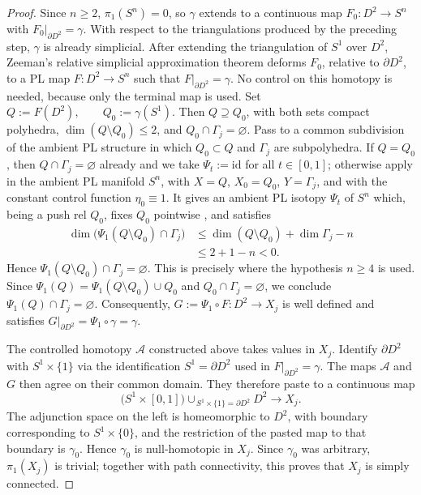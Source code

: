 \documentclass[12pt,oneside,a4paper]{article}
\theoremstyle{mytheorem}
\theoremstyle{remark}
\theoremstyle{definition}
\begin{document}
\begin{proof}
Since $n\geq2$, $\pi_1(S^n)=0$, so $\gamma$ extends to a
continuous map $F_0:D^2\to S^n$ with
$F_0|_{\partial D^2}=\gamma$.  With respect to the triangulations produced by the preceding step,
$\gamma$ is already simplicial. After extending the triangulation of $S^1$
over $D^2$, Zeeman's relative simplicial approximation theorem
\cite{zbMATH03195022} deforms
$F_0$, relative to $\partial D^2$, to a PL map
$F:D^2\to S^n$ such that $F|_{\partial D^2}=\gamma$.  No control on this
homotopy is needed, because only the terminal map is used.  Set
$Q:=F(D^2),\qquad Q_0:=\gamma(S^1).$
Then $Q\supseteq Q_0$, with both sets compact polyhedra,
$\dim(Q\setminus Q_0)\leq2$, and
$Q_0\cap\Gamma_j=\varnothing$.  Pass to a common subdivision of the
ambient PL structure in which $Q_0\subset Q$ and $\Gamma_j$ are
subpolyhedra.  If $Q=Q_0$, then
$Q\cap\Gamma_j=\varnothing$ already and we take
$\Psi_t:=\mathrm{id}$ for all $t\in[0,1]$;
otherwise apply \cite[Theorem~4.2]{zbMATH01714503} in the ambient PL
manifold $S^n$, with $X=Q$, $X_0=Q_0$, $Y=\Gamma_j$, and with the
constant control function $\eta_0\equiv1$.  It gives an ambient PL isotopy $\Psi_t$ of
$S^n$ which, being a push rel $Q_0$, fixes $Q_0$ pointwise
\cite[\S4]{zbMATH01714503}, and satisfies
\[
\begin{aligned}
 \dim\bigl(\Psi_1(Q\setminus Q_0)\cap\Gamma_j\bigr)
 &\leq\dim(Q\setminus Q_0)+\dim\Gamma_j-n\\
 &\leq2+1-n<0.
\end{aligned}
\]
Hence $\Psi_1(Q\setminus Q_0)\cap\Gamma_j=\varnothing$.
This is precisely where the hypothesis $n\geq4$ is used.  Since
$\Psi_1(Q)=\Psi_1(Q\setminus Q_0)\cup Q_0$ and
$Q_0\cap\Gamma_j=\varnothing$, we
conclude $\Psi_1(Q)\cap\Gamma_j=\varnothing$.  Consequently,
$G:=\Psi_1\circ F:D^2\to X_j$ is well defined and satisfies
$G|_{\partial D^2}=\Psi_1\circ\gamma=\gamma$.

The controlled homotopy $\mathcal A$ constructed above takes values in
$X_j$.  Identify $\partial D^2$ with $S^1\times\{1\}$ via the
identification $S^1=\partial D^2$ used in
$F|_{\partial D^2}=\gamma$.  The maps $\mathcal A$ and $G$ then agree on
their common domain.
They therefore paste to a continuous map
\[
 \bigl(S^1\times[0,1]\bigr)
 \cup_{\,S^1\times\{1\}=\partial D^2}D^2
 \longrightarrow X_j.
\]
The adjunction space on the left is homeomorphic to $D^2$, with
boundary corresponding to $S^1\times\{0\}$, and the restriction of the
pasted map to that boundary is $\gamma_0$.  Hence $\gamma_0$ is
null-homotopic in $X_j$.  Since $\gamma_0$ was arbitrary,
$\pi_1(X_j)$ is trivial; together with path connectivity, this proves
that $X_j$ is simply connected.


\end{proof}
\end{document}
